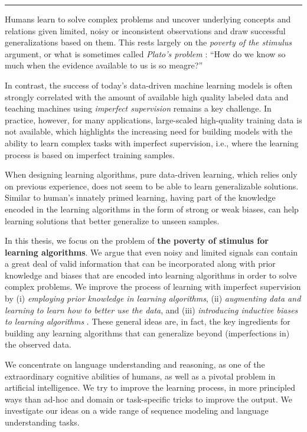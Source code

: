 \summary
\vspace{-30pt}
\textbf{} 
\vspace{-10pt}\par\noindent\rule{\textwidth}{0.4pt}

Humans learn to solve complex problems and uncover underlying concepts and relations given limited, noisy or inconsistent observations and draw successful generalizations based on them. This rests largely on the \emph{poverty of the stimulus} argument, or what is sometimes called \emph{Plato’s problem}%
: ``How do we know so much when the evidence available to us is so meagre?''

In contrast, the success of today's data-driven machine learning models is often strongly correlated with the amount of available high quality labeled data
and teaching machines using \emph{imperfect supervision} remains a key challenge. In practice, however, for many applications, large-scaled high-quality training data is not available, which highlights the increasing need for building models with the ability to learn complex tasks with imperfect supervision, i.e., where the learning process is based on imperfect training samples. %

When designing learning algorithms, pure data-driven learning, which relies only on previous experience, does not seem to be able to learn generalizable solutions.
Similar to human's innately primed learning, having part of the knowledge encoded in the learning algorithms in the form of strong or weak biases, can help learning solutions that better generalize to unseen samples. %

In this thesis, we focus on the problem of \textbf{the poverty of stimulus for learning algorithms}. We argue that even noisy and limited signals can contain a great deal of valid information that can be incorporated along with prior knowledge and biases that are encoded into learning algorithms in order to solve complex problems. We improve the process of learning with imperfect supervision by (i) \emph{employing  prior knowledge in learning algorithms}, (ii) \emph{augmenting data and learning to learn how to better use the data}, and (iii) \emph{introducing inductive biases to learning algorithms} . 
%
These general ideas are, in fact, the key ingredients for building any learning algorithms that can generalize beyond (imperfections in) the observed data. %

We concentrate on language understanding and reasoning, as one of the extraordinary cognitive abilities of humans, as well as a pivotal problem in artificial intelligence. We try to improve the learning process, in more principled ways than ad-hoc and domain or task-specific tricks to improve the output. We investigate our ideas on a wide range of sequence modeling and language understanding tasks.


